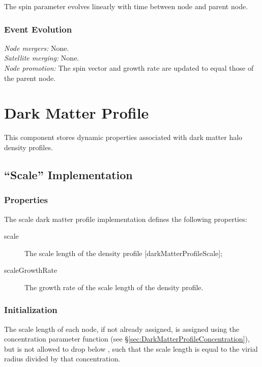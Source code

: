 The spin parameter evolves linearly with time between \gls{node} and parent node.

\subsubsection{Event Evolution}

\noindent\emph{Node mergers:} None.\\

\noindent\emph{Satellite merging:} None.\\

\noindent\emph{Node promotion:} The spin vector and growth rate are updated to equal those of the parent node.\\

\section{Dark Matter Profile}\label{sec:DarkMatterProfileComponent}

This \gls{component} stores dynamic properties associated with dark matter halo density profiles.

\subsection{``Scale'' Implementation}\label{sec:DarkMatterProfileScale}

\subsubsection{Properties}

The scale dark matter profile implementation defines the following properties:
\begin{description}
 \item [{\normalfont \ttfamily scale}] The scale length of the density profile [{\normalfont \ttfamily darkMatterProfileScale}];
 \item [{\normalfont \ttfamily scaleGrowthRate}] The growth rate of the scale length of the density profile.
\end{description}

\subsubsection{Initialization}

The scale length of each node, if not already assigned, is assigned using the concentration parameter function (see \S\ref{sec:DarkMatterProfileConcentration}), but is not allowed to drop below {\normalfont \ttfamily [darkMatterProfileMinimumConcentration]}, such that the scale length is equal to the virial radius divided by that concentration.

